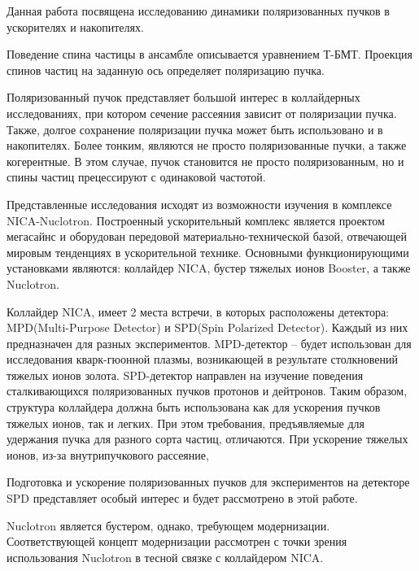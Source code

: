 \par Данная работа посвящена исследованию динамики поляризованных пучков в ускорителях и накопителях.

\par Поведение спина частицы в ансамбле описывается уравнением Т-БМТ. 
Проекция спинов частиц на заданную ось определяет поляризацию пучка.

\par Поляризованный пучок представляет большой интерес в коллайдерных исследованиях, при котором сечение рассеяния зависит от поляризации пучка.
Также, долгое сохранение поляризации пучка может быть использовано и в накопителях. 
Более тонким, являются не просто поляризованные пучки, а также когерентные. В этом случае, пучок становится не просто поляризованным, но и спины частиц прецессируют с одинаковой частотой. 

\par Представленные исследования исходят из возможности изучения в комплексе NICA-Nuclotron. Построенный ускорительный комплекс является проектом мегасайнс и оборудован передовой материально-технической базой, отвечающей мировым тенденциях в ускорительной технике. Основными функционирующими установками являются: коллайдер NICA, бустер тяжелых ионов Booster, а также Nuclotron. 

\par Коллайдер NICA, имеет 2 места встречи, в которых расположены детектора: MPD(Multi-Purpose Detector) и SPD(Spin Polarized Detector). Каждый из них предназначен для разных экспериментов. MPD-детектор – будет использован для исследования кварк-гюонной плазмы, возникающей в результате столкновений тяжелых ионов золота. SPD-детектор направлен на изучение поведения сталкивающихся поляризованных пучков протонов и дейтронов. Таким образом, структура коллайдера должна быть использована как для ускорения пучков тяжелых ионов, так и легких. При этом требования, предъявляемые для удержания пучка для разного сорта частиц, отличаются. При ускорение тяжелых ионов, из-за внутрипучкового рассеяние, 

\par Подготовка и ускорение поляризованных пучков для экспериментов на детекторе SPD представляет особый интерес и будет рассмотрено в этой работе. 

\par Nuclotron является бустером, однако, требующем модернизации. Соответствующей концепт модернизации рассмотрен с точки зрения использования Nuclotron в тесной связке с коллайдером NICA. 

